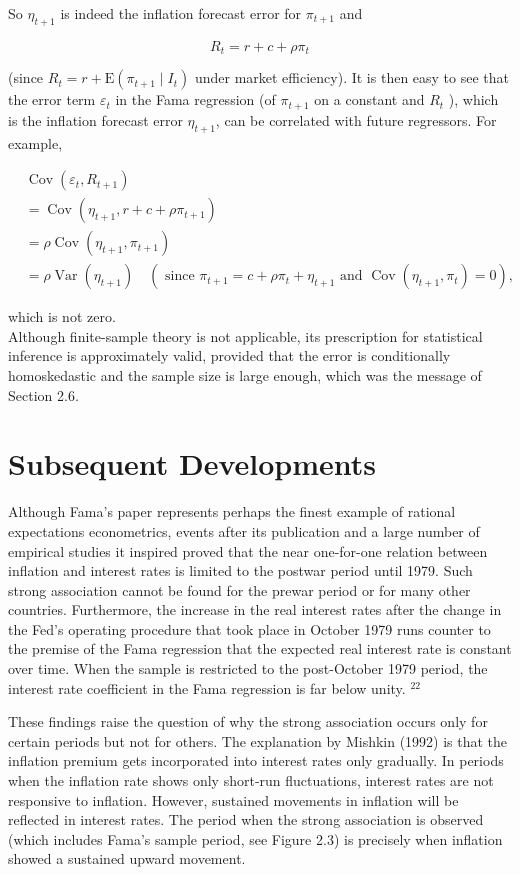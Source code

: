 \documentclass[10pt]{article}
\begin{document}
So $\eta_{t+1}$ is indeed the inflation forecast error for $\pi_{t+1}$ and

$$
R_{t}=r+c+\rho \pi_{t}
$$

(since $R_{t}=r+\mathrm{E}\left(\pi_{t+1} \mid I_{t}\right)$ under market efficiency). It is then easy to see that the error term $\varepsilon_{t}$ in the Fama regression (of $\pi_{t+1}$ on a constant and $R_{t}$ ), which is the inflation forecast error $\eta_{t+1}$, can be correlated with future regressors. For example,

$$
\begin{aligned}
& \operatorname{Cov}\left(\varepsilon_{t}, R_{t+1}\right) \\
& =\operatorname{Cov}\left(\eta_{t+1}, r+c+\rho \pi_{t+1}\right) \\
& =\rho \operatorname{Cov}\left(\eta_{t+1}, \pi_{t+1}\right) \\
& =\rho \operatorname{Var}\left(\eta_{t+1}\right) \quad\left(\text { since } \pi_{t+1}=c+\rho \pi_{t}+\eta_{t+1} \text { and } \operatorname{Cov}\left(\eta_{t+1}, \pi_{t}\right)=0\right),
\end{aligned}
$$

which is not zero.\\
Although finite-sample theory is not applicable, its prescription for statistical inference is approximately valid, provided that the error is conditionally homoskedastic and the sample size is large enough, which was the message of Section 2.6.

\section*{Subsequent Developments}
Although Fama's paper represents perhaps the finest example of rational expectations econometrics, events after its publication and a large number of empirical studies it inspired proved that the near one-for-one relation between inflation and interest rates is limited to the postwar period until 1979. Such strong association cannot be found for the prewar period or for many other countries. Furthermore, the increase in the real interest rates after the change in the Fed's operating procedure that took place in October 1979 runs counter to the premise of the Fama regression that the expected real interest rate is constant over time. When the sample is restricted to the post-October 1979 period, the interest rate coefficient in the Fama regression is far below unity. ${ }^{22}$

These findings raise the question of why the strong association occurs only for certain periods but not for others. The explanation by Mishkin (1992) is that the inflation premium gets incorporated into interest rates only gradually. In periods when the inflation rate shows only short-run fluctuations, interest rates are not responsive to inflation. However, sustained movements in inflation will be reflected in interest rates. The period when the strong association is observed (which includes Fama's sample period, see Figure 2.3) is precisely when inflation showed a sustained upward movement.
\end{document}

